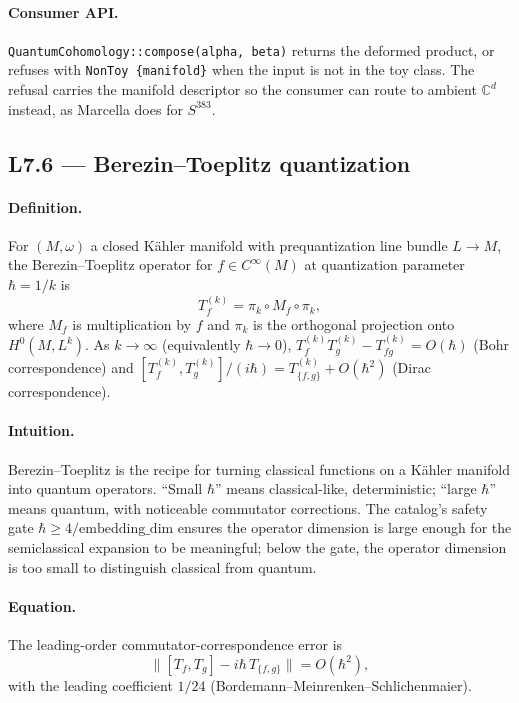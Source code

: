\documentclass[11pt,letterpaper]{article}
\begin{document}
\paragraph{Consumer API.}
\texttt{QuantumCohomology::compose(alpha, beta)} returns the
deformed product, or refuses with
\texttt{NonToy \{manifold\}} when the input is not in the toy
class. The refusal carries the manifold descriptor so the consumer
can route to ambient $\mathbb{C}^d$ instead, as Marcella does for
$S^{383}$.


\subsection{L7.6 --- Berezin--Toeplitz quantization}

\paragraph{Definition.}
For $(M, \omega)$ a closed K\"ahler manifold with prequantization
line bundle $L \to M$, the Berezin--Toeplitz operator for $f \in
C^\infty(M)$ at quantization parameter $\hbar = 1/k$ is
\[
T_f^{(k)} = \pi_k \circ M_f \circ \pi_k,
\]
where $M_f$ is multiplication by $f$ and $\pi_k$ is the orthogonal
projection onto $H^0(M, L^k)$. As $k \to \infty$ (equivalently
$\hbar \to 0$), $T_f^{(k)} T_g^{(k)} - T_{fg}^{(k)} = O(\hbar)$
(Bohr correspondence) and
$[T_f^{(k)}, T_g^{(k)}] / (i\hbar) = T_{\{f, g\}}^{(k)} +
O(\hbar^2)$ (Dirac correspondence).

\paragraph{Intuition.}
Berezin--Toeplitz is the recipe for turning classical functions on
a K\"ahler manifold into quantum operators. ``Small $\hbar$''
means classical-like, deterministic; ``large $\hbar$'' means
quantum, with noticeable commutator corrections. The catalog's
safety gate $\hbar \geq 4 / \text{embedding\_dim}$ ensures the
operator dimension is large enough for the semiclassical expansion
to be meaningful; below the gate, the operator dimension is too
small to distinguish classical from quantum.

\paragraph{Equation.}
The leading-order commutator-correspondence error is
\[
\bigl\| [T_f, T_g] - i\hbar \, T_{\{f, g\}} \bigr\|
= O(\hbar^2),
\]
with the leading coefficient $1/24$ (Bordemann--Meinrenken--Schlichenmaier).
\end{document}
